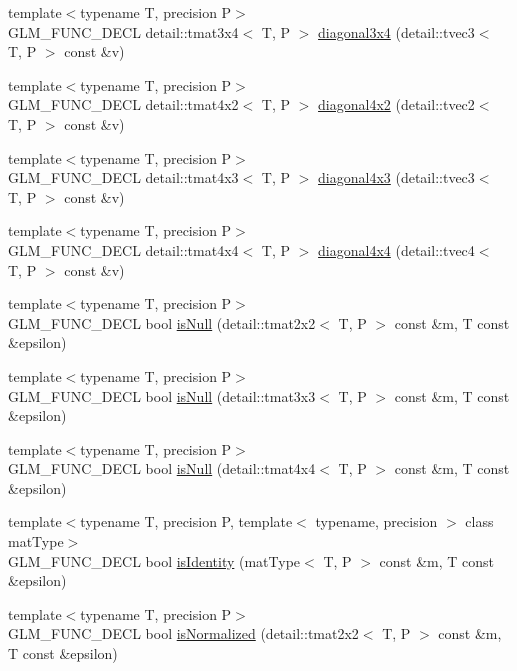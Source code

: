 \begin{CompactItemize}
\item 
{\footnotesize template$<$typename T, precision P$>$ }\\GLM\_\-FUNC\_\-DECL detail::tmat3x4$<$ T, P $>$ \hyperlink{group__gtx__matrix__operation_g57adf8191f7e67838ee97d9f366fef16}{diagonal3x4} (detail::tvec3$<$ T, P $>$ const \&v)
\item 
{\footnotesize template$<$typename T, precision P$>$ }\\GLM\_\-FUNC\_\-DECL detail::tmat4x2$<$ T, P $>$ \hyperlink{group__gtx__matrix__operation_ge32f9a70411084d4b33464c23b04c997}{diagonal4x2} (detail::tvec2$<$ T, P $>$ const \&v)
\item 
{\footnotesize template$<$typename T, precision P$>$ }\\GLM\_\-FUNC\_\-DECL detail::tmat4x3$<$ T, P $>$ \hyperlink{group__gtx__matrix__operation_g9b918f5e6a6224398447d2c79861d8fd}{diagonal4x3} (detail::tvec3$<$ T, P $>$ const \&v)
\item 
{\footnotesize template$<$typename T, precision P$>$ }\\GLM\_\-FUNC\_\-DECL detail::tmat4x4$<$ T, P $>$ \hyperlink{group__gtx__matrix__operation_g32c8da8ef592e0c0891d1593ffb524db}{diagonal4x4} (detail::tvec4$<$ T, P $>$ const \&v)
\item 
{\footnotesize template$<$typename T, precision P$>$ }\\GLM\_\-FUNC\_\-DECL bool \hyperlink{group__gtx__matrix__query_g54401e84073257d2bab8680e207ef405}{isNull} (detail::tmat2x2$<$ T, P $>$ const \&m, T const \&epsilon)
\item 
{\footnotesize template$<$typename T, precision P$>$ }\\GLM\_\-FUNC\_\-DECL bool \hyperlink{group__gtx__matrix__query_ge3db03e8b4aea5dc381bc45d1d3935eb}{isNull} (detail::tmat3x3$<$ T, P $>$ const \&m, T const \&epsilon)
\item 
{\footnotesize template$<$typename T, precision P$>$ }\\GLM\_\-FUNC\_\-DECL bool \hyperlink{group__gtx__matrix__query_g227812585b9411f506b157afcda55e9c}{isNull} (detail::tmat4x4$<$ T, P $>$ const \&m, T const \&epsilon)
\item 
{\footnotesize template$<$typename T, precision P, template$<$ typename, precision $>$ class matType$>$ }\\GLM\_\-FUNC\_\-DECL bool \hyperlink{group__gtx__matrix__query_gb4ab3ce59ca59a610875732215027cc3}{isIdentity} (matType$<$ T, P $>$ const \&m, T const \&epsilon)
\item 
{\footnotesize template$<$typename T, precision P$>$ }\\GLM\_\-FUNC\_\-DECL bool \hyperlink{group__gtx__matrix__query_g08507235ac0ddb0a274ac1e1b10cbf39}{isNormalized} (detail::tmat2x2$<$ T, P $>$ const \&m, T const \&epsilon)

\end{CompactItemize}
